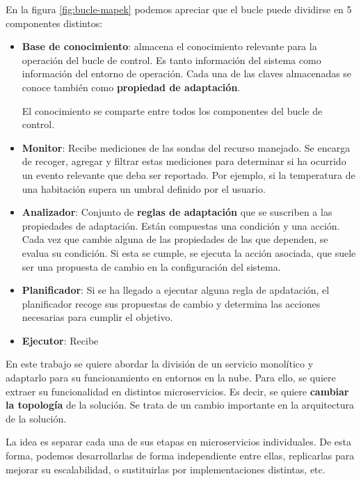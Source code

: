 En la figura \ref{fig:bucle-mapek} podemos apreciar que el bucle puede dividirse en 5 componentes distintos: \cite{ArchitecturalBlueprintAutonomic2006}

\begin{itemize}
  \item \textbf{Base de conocimiento}: almacena el conocimiento relevante para la operación del bucle de control. Es tanto información del sistema como información del entorno de operación. Cada una de las claves almacenadas se conoce también como \textbf{propiedad de adaptación}.

  El conocimiento se comparte entre todos los componentes del bucle de control.

  \item \textbf{Monitor}: Recibe mediciones de las sondas del recurso manejado. Se encarga de recoger, agregar y filtrar estas mediciones para determinar si ha ocurrido un evento relevante que deba ser reportado. Por ejemplo, si la temperatura de una habitación supera un umbral definido por el usuario.

  \item \textbf{Analizador}: Conjunto de \textbf{reglas de adaptación} que se suscriben a las propiedades de adaptación. Están compuestas una condición y una acción. Cada vez que cambie alguna de las propiedades de las que dependen, se evalua su condición. Si esta se cumple, se ejecuta la acción asociada, que suele ser una propuesta de cambio en la configuración del sistema.

  \item \textbf{Planificador}: Si se ha llegado a ejecutar alguna regla de apdatación, el planificador recoge sus propuestas de cambio y determina las acciones necesarias para cumplir el objetivo.

  \item \textbf{Ejecutor}: Recibe
\end{itemize}


En este trabajo se quiere abordar la división de un servicio monolítico y adaptarlo para su funcionamiento en entornos en la nube. Para ello, se quiere extraer su funcionalidad en distintos microservicios. Es decir, se quiere \textbf{cambiar la topología} de la solución. Se trata de un cambio importante en la arquitectura de la solución.


La idea es separar cada una de sus etapas en microservicios individuales. De esta forma, podemos desarrollarlas de forma independiente entre ellas, replicarlas para mejorar su escalabilidad, o sustituirlas por implementaciones distintas, etc.

